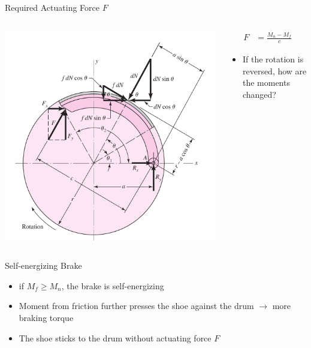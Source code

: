 \documentclass[10pt, svgnames]{beamer}
\begin{document}
\begin{frame}[label={sec:org3b5ba19}]{Required Actuating Force \(F\)}
\begin{columns}
\begin{column}{0.6\columnwidth}
\begin{center}
\includegraphics[width=1.1\textwidth]{./pictures/internal-drum-brake.png}
\end{center}
\end{column}

\begin{column}{0.4\columnwidth}
\begin{align*}
    F &= \frac{M_{n} - M_{f}}{c}
\end{align*}

\begin{itemize}
\item If the rotation is reversed, how are the moments changed?
\end{itemize}
\end{column}
\end{columns}
\end{frame}

\begin{frame}[label={sec:orge83a1ef}]{Self-energizing Brake}
\begin{itemize}
\item if \(M_f \geqslant M_n\), the brake is \alert{self-energizing}
\item Moment from friction further presses the shoe against the drum \(\rightarrow\) more braking torque
\item The shoe sticks to the drum \alert{without} actuating force \(F\)
\end{itemize}
\end{frame}
\end{document}
